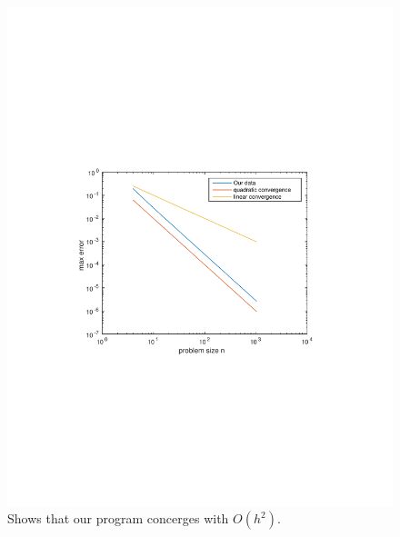 
\begin{figure}[h]
\centering
\includegraphics[width=0.7\linewidth, trim= 3cm 8.5cm 3cm 9cm, clip=true]{checkConv}
\caption{Shows that our program concerges with $O(h^2)$.}
\label{fig:checkConv}
\end{figure}